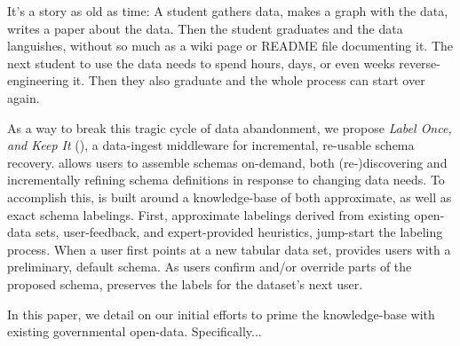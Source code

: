 
It's a story as old as time: A student gathers data, makes a graph with the data, writes a paper about the data.
Then the student graduates and the data languishes, without so much as a wiki page or README file documenting it.
The next student to use the data needs to spend hours, days, or even weeks reverse-engineering it.
Then they also graduate and the whole process can start over again.

As a way to break this tragic cycle of data abandonment, we propose \emph{Label Once, and Keep It} (\systemname), a data-ingest middleware for incremental, re-usable schema recovery.
\systemname allows users to assemble schemas on-demand, both (re-)discovering and incrementally refining schema definitions in response to changing data needs.  
To accomplish this, \systemname is built around a knowledge-base of both approximate, as well as exact schema labelings.
First, approximate labelings derived from existing open-data sets, user-feedback, and expert-provided heuristics, jump-start the labeling process.
When a user first points \systemname at a new tabular data set, \systemname provides users with a preliminary, default schema.
As users confirm and/or override parts of the proposed schema, \systemname preserves the labels for the dataset's next user.




In this paper, we detail on our initial efforts to prime the \systemname knowledge-base with existing governmental open-data.
Specifically...






